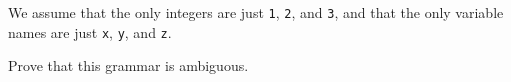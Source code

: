 \documentclass[11pt]{article}
\begin{document}
\begin{enumerate}
\begin{grammar}
                  \end{grammar}

                  \smallskip

                  We assume that the only integers are just \texttt{1},
                  \texttt{2}, and \texttt{3}, and that the only variable
                  names are just \texttt{x}, \texttt{y}, and \texttt{z}.

                  Prove that this grammar is ambiguous.

                  \pagebreak


\end{enumerate}
\end{document}
